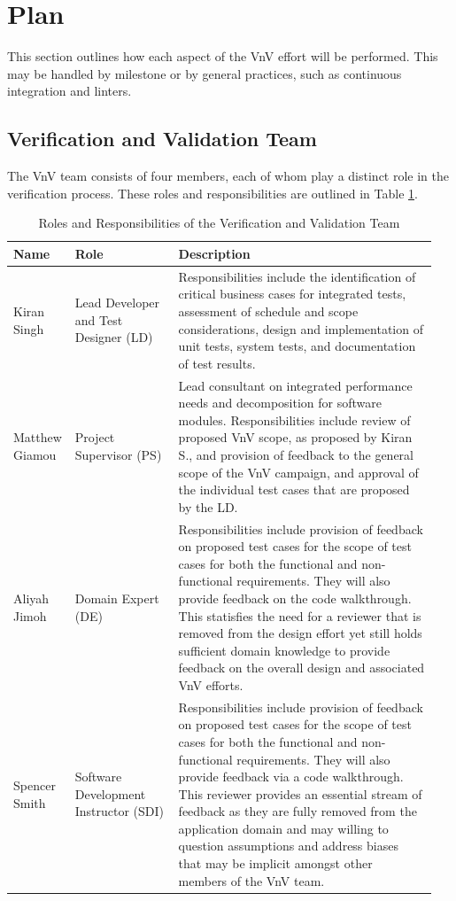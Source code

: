 \documentclass[12pt, titlepage]{article}
\begin{document}
\section{Plan}
This section outlines how each aspect of the VnV effort will be performed. This may be handled by 
milestone or by general practices, such as continuous integration and linters. 

\subsection{Verification and Validation Team}
The VnV team consists of four members, each of whom play a distinct role in the 
verification process. These roles and responsibilities are outlined in Table \ref{Table_Ver_Roles}.

\begin{table}[tbp!]
  \centering
  \begin{tabular}{|p{0.11\linewidth}|p{0.24\linewidth}|p{0.6\linewidth}|} 
    \hline
    \textbf{Name} & \textbf{Role} & \textbf{Description}\\
    \hline
    Kiran Singh & Lead Developer and Test Designer (LD) & Responsibilities include the
    identification of critical business cases for integrated tests, assessment of 
    schedule and scope considerations,  design and implementation of unit tests, 
    system tests, and documentation of test results.\\
    \hline
    Matthew Giamou & Project Supervisor (PS) & Lead consultant on integrated 
    performance needs and decomposition for software modules. Responsibilities 
    include review of proposed VnV scope, as proposed by 
    Kiran S., and provision of feedback to the general scope of the VnV campaign, and approval 
    of the individual test cases that are proposed by the LD. \\
    \hline
    Aliyah Jimoh & Domain Expert (DE) & Responsibilities include provision of 
    feedback on proposed test cases for the 
    scope of test cases for both the functional and non-functional requirements. They 
    will also provide feedback on the code walkthrough. 
    This statisfies the need for a reviewer that is removed from the design effort yet
    still holds sufficient domain knowledge to provide feedback on the overall design 
    and associated VnV efforts.\\ 
    \hline
    Spencer Smith & Software Development Instructor (SDI) & Responsibilities include 
    provision of feedback on proposed test cases for the scope of test cases 
    for both the functional and non-functional requirements. They will also 
    provide feedback via a code walkthrough. 
    This reviewer provides an essential stream of feedback as they are fully removed 
    from the application domain and may willing to question assumptions and address biases 
    that may be implicit amongst other members of the VnV team.\\
    \bottomrule
  \end{tabular}\\
  \caption{Roles and Responsibilities of the Verification and Validation Team}
  \label{Table_Ver_Roles}
\end{table}
\end{document}

